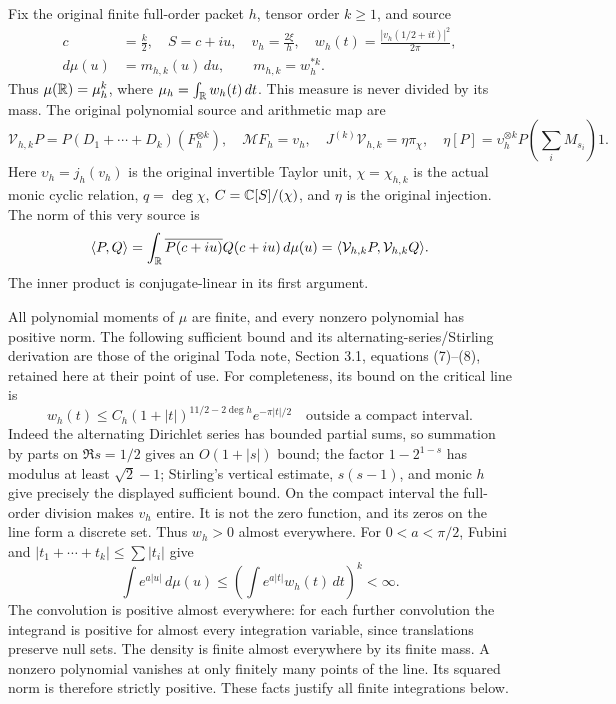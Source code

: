 \documentclass[11pt]{article}
\begin{document}
Fix the original finite full-order packet \(h\), tensor order \(k\geq1\),
and source
\begin{equation}\label{mrfinite:eq:source}
\begin{aligned}
 c&=\frac{k}{2},\quad S=c+iu,\quad v_h=\frac{2\xi}{h},\quad
 w_h(t)=\frac{|v_h(1/2+it)|^2}{2\pi},\\
 d\mu(u)&=m_{h,k}(u)\,du,\qquad m_{h,k}=w_h^{*k}.
\end{aligned}
\end{equation}
Thus \(\mu(\mathbb R)=\mu_h^k\), where \(\mu_h=\int_\mathbb R w_h(t)\,dt\).
This measure is never divided by its mass.
The original polynomial source and arithmetic map are
\begin{equation}\label{mrfinite:eq:original-maps}
 \mathcal V_{h,k}P
   =P(D_1+\cdots+D_k)(F_h^{\otimes k}),\quad
 \mathcal M F_h=v_h,\quad
 J^{(k)}\mathcal V_{h,k}=\eta\pi_\chi,
 \quad
 \eta[P]=\upsilon_h^{\otimes k}
             P\!\left(\sum_iM_{s_i}\right)1.
\end{equation}
Here \(\upsilon_h=j_h(v_h)\) is the original invertible Taylor unit,
\(\chi=\chi_{h,k}\) is the actual monic cyclic relation,
\(q=\deg\chi\), \(C=\mathbb C[S]/(\chi)\), and \(\eta\) is the original
injection. The norm of this very source is
\begin{equation}\label{mrfinite:eq:inner}
 \langle P,Q\rangle
 =\int_\mathbb R\overline{P(c+iu)}Q(c+iu)\,d\mu(u)
 =\langle\mathcal V_{h,k}P,\mathcal V_{h,k}Q\rangle.
\end{equation}
The inner product is conjugate-linear in its first argument.

All polynomial moments of \(\mu\) are finite, and every nonzero
polynomial has positive norm. The following sufficient bound and its
alternating-series/Stirling derivation are those of the original Toda
note, Section 3.1, equations (7)--(8), retained here at their point of
use. For completeness, its bound on the critical line is
\[
 w_h(t)\leq C_h(1+|t|)^{11/2-2\deg h}e^{-\pi|t|/2}
 \quad\text{outside a compact interval}.
\]
Indeed the alternating Dirichlet series has bounded partial sums, so
summation by parts on \(\Re s=1/2\) gives an \(O(1+|s|)\) bound; the
factor \(1-2^{1-s}\) has modulus at least \(\sqrt2-1\); Stirling's
vertical estimate, \(s(s-1)\), and monic \(h\) give precisely the
displayed sufficient bound. On the compact interval the full-order
division makes \(v_h\) entire. It is not the zero function, and its
zeros on the line form a discrete set. Thus \(w_h>0\) almost everywhere.
For \(0<a<\pi/2\), Fubini and \(|t_1+\cdots+t_k|\leq\sum|t_i|\) give
\[
 \int e^{a|u|}\,d\mu(u)
 \leq\left(\int e^{a|t|}w_h(t)\,dt\right)^k<\infty.
\]
The convolution is positive almost everywhere: for each further
convolution the integrand is positive for almost every integration
variable, since translations preserve null sets. The density is finite
almost everywhere by its finite mass. A nonzero polynomial vanishes at
only finitely many points of the line. Its squared norm is therefore
strictly positive. These facts justify all finite integrations below.
\end{document}
